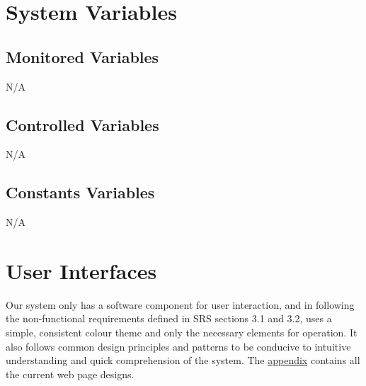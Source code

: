 \documentclass[12pt, titlepage]{article}
\begin{document}
\section{System Variables}
\subsection{Monitored Variables}
N/A

\subsection{Controlled Variables}
N/A

\subsection{Constants Variables}
N/A

\section{User Interfaces}
Our system only has a software component for user interaction, and in following the non-functional requirements defined in SRS sections 3.1 and 3.2, uses a simple, consistent colour theme and only the necessary elements for operation. It also follows common design principles and patterns to be conducive to intuitive understanding and quick comprehension of the system.
The \hyperlink{A}{appendix} contains all the current web page designs. 
\end{document}
